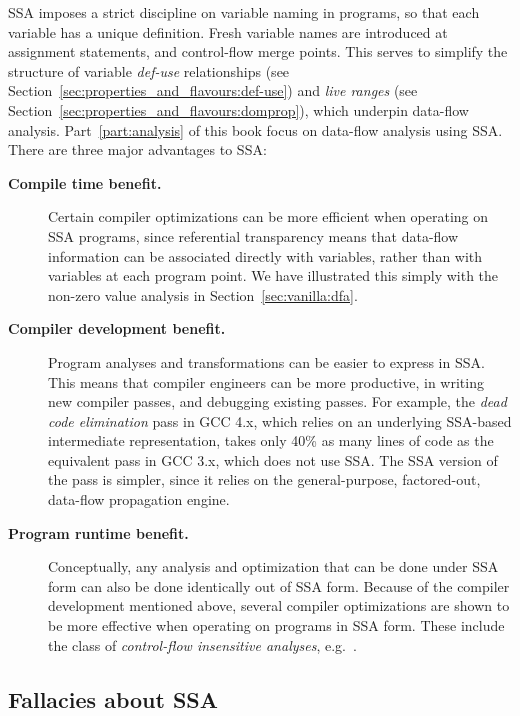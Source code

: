 SSA imposes a strict discipline on variable naming in programs, so that each variable has a unique definition. 
Fresh variable names are introduced at assignment statements, and control-flow merge points. 
This serves to simplify the structure of variable \emph{def-use} relationships (see Section~\ref{sec:properties_and_flavours:def-use}) and \emph{live ranges} (see Section~\ref{sec:properties_and_flavours:domprop}), which underpin data-flow analysis. 
Part~\ref{part:analysis} of this book focus on data-flow analysis using SSA. 
There are three major advantages to SSA:
\begin{description}
\item[\textbf{Compile time benefit.}] 
  Certain compiler optimizations can be more efficient when operating on SSA programs, since referential transparency means that data-flow information can be associated directly with variables, rather than with variables at each program point. 
  We have illustrated this simply with the non-zero value analysis in Section~\ref{sec:vanilla:dfa}.
\item[\textbf{Compiler development benefit.}] 
  Program analyses and transformations can be easier to express in SSA. 
  This means that compiler engineers can be more productive, in writing new compiler passes, and debugging existing passes. 
  For example, the \textit{dead code elimination} pass in GCC 4.x, which relies on an underlying SSA-based intermediate representation, takes only 40\% as many lines of code as the equivalent pass in GCC 3.x, which does not use SSA. 
  The SSA version of the pass is simpler, since it relies on the general-purpose, factored-out, data-flow propagation engine.
\item[\textbf{Program runtime benefit.}] 
  Conceptually, any analysis and optimization that can be done under SSA form can also be done identically out of SSA form. 
  Because of the compiler development mentioned above, several compiler optimizations are shown to be more effective when operating on programs in SSA form. 
  These include the class of \textit{control-flow insensitive analyses}, e.g.\ \cite{hasti98using}.
\end{description}


\vspace{-2ex}
\subsection{Fallacies about SSA}
\vspace{-1mm}

